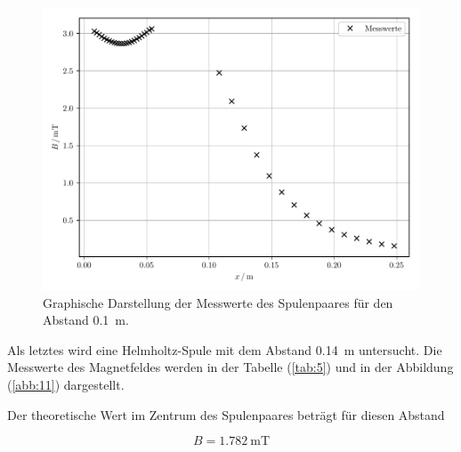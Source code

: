 \begin{figure}[H]
  \includegraphics{plot4.pdf}
  \caption{Graphische Darstellung der Messwerte des Spulenpaares für den Abstand \SI{0.1}{\meter}.}
  \label{abb:10}
\end{figure}

Als letztes wird eine Helmholtz-Spule mit dem Abstand \SI{0.14}{\meter} untersucht.
Die Messwerte des Magnetfeldes werden in der Tabelle (\ref{tab:5}) und in der Abbildung
(\ref{abb:11}) dargestellt.

Der theoretische Wert im Zentrum des Spulenpaares beträgt für diesen Abstand

\begin{equation*}
  B = \SI{1.782}{\milli\tesla}
\end{equation*}

